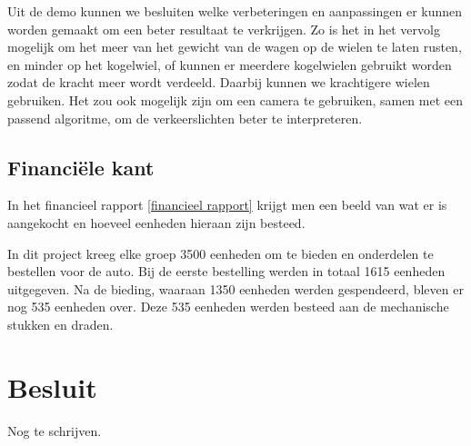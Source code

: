 \documentclass[a4paper,twoside,kulak]{kulakreport} %
\begin{document}
Uit de demo kunnen we besluiten welke verbeteringen en aanpassingen er kunnen worden gemaakt om een beter resultaat te verkrijgen. Zo is het in het vervolg mogelijk om het meer van het gewicht van de wagen op de wielen te laten rusten, en minder op het kogelwiel, of kunnen er meerdere kogelwielen gebruikt worden zodat de kracht meer wordt verdeeld. Daarbij kunnen we krachtigere wielen gebruiken. Het zou ook mogelijk zijn om een camera te gebruiken, samen met een passend algoritme, om de verkeerslichten beter te interpreteren.

\subsection{Financiële kant} 
In het financieel rapport \ref{financieel rapport} krijgt men een beeld van wat er is aangekocht en hoeveel eenheden hieraan zijn besteed.  

In dit project kreeg elke groep 3500 eenheden om te bieden en onderdelen te bestellen voor de auto. Bij de eerste bestelling werden in totaal 1615 eenheden uitgegeven. Na de bieding, waaraan 1350 eenheden werden gespendeerd, bleven er nog 535 eenheden over. Deze 535 eenheden werden besteed aan de mechanische stukken en draden. 



\section{Besluit}
Nog te schrijven.



\newpage

\appendix
\label{financieel rapport}
\label{TechTekChassis}
\label{TechTekWiel}
\label{TechTekMotor}
\label{TechTekMicrocontroller}
\label{TechTekReflectiesensor}
\label{TechTekAfstandssensor}
\label{TechTekKleurensensor}







\end{document}
